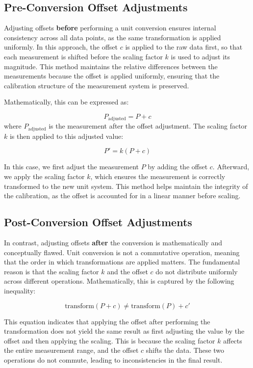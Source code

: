 \documentclass{article}
\begin{document}
\subsection{Pre-Conversion Offset Adjustments}
Adjusting offsets \textbf{before} performing a unit conversion ensures internal consistency across all data points, as the same transformation is applied uniformly. In this approach, the offset \( c \) is applied to the raw data first, so that each measurement is shifted before the scaling factor \( k \) is used to adjust its magnitude. This method maintains the relative differences between the measurements because the offset is applied uniformly, ensuring that the calibration structure of the measurement system is preserved.

Mathematically, this can be expressed as:

\[
P_{\text{adjusted}} = P + c
\]
where \( P_{\text{adjusted}} \) is the measurement after the offset adjustment. The scaling factor \( k \) is then applied to this adjusted value:

\[
P' = k(P + c)
\]

In this case, we first adjust the measurement \( P \) by adding the offset \( c \). Afterward, we apply the scaling factor \( k \), which ensures the measurement is correctly transformed to the new unit system. This method helps maintain the integrity of the calibration, as the offset is accounted for in a linear manner before scaling.

\subsection{Post-Conversion Offset Adjustments}
In contrast, adjusting offsets \textbf{after} the conversion is mathematically and conceptually flawed. Unit conversion is not a commutative operation, meaning that the order in which transformations are applied matters. The fundamental reason is that the scaling factor \( k \) and the offset \( c \) do not distribute uniformly across different operations. Mathematically, this is captured by the following inequality:

\[
\text{transform}(P + c) \neq \text{transform}(P) + c'
\]

This equation indicates that applying the offset after performing the transformation does not yield the same result as first adjusting the value by the offset and then applying the scaling. This is because the scaling factor \( k \) affects the entire measurement range, and the offset \( c \) shifts the data. These two operations do not commute, leading to inconsistencies in the final result.
\end{document}
